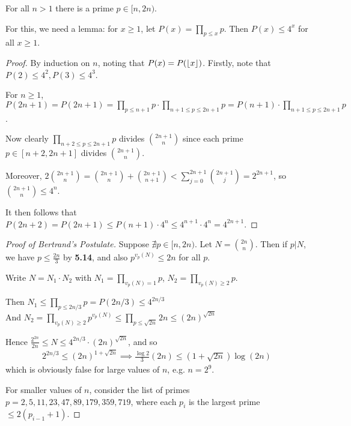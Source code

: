 \documentclass[10pt,a4paper]{article}
\begin{document}
\begin{theorem}
For all $n > 1$ there is a prime $p \in [n, 2n)$.
\end{theorem}
For this, we need a lemma: for $x \geq 1$, let $P(x) = \prod_{p\leq x} p$. Then $P(x) \leq 4^x$ for all $x \geq 1$.
\begin{proof}
By induction on $n$, noting that $P(x) = P(\lfloor x \rfloor)$. Firstly, note that $P(2) \leq 4^2, P(3) \leq 4^3$.

For $n\geq 1$, $P(2n+1) = P(2n+1) = \prod_{p\leq n+1} p \cdot \prod_{n+1\leq p\leq 2n+1} p = P(n+1) \cdot \prod_{n+1 \leq p\leq 2n+1} p$.

Now clearly $\prod_{n+2\leq p\leq 2n+1}p$ divides $\binom{2n+1}{n}$ since each prime $p \in [n+2, 2n+1]$ divides $\binom{2n+1}{n}$. 

Moreover, $2\binom{2n+1}{n} = \binom{2n+1}{n} + \binom{2n+1}{n+1} < \sum_{j=0}^{2n+1} \binom{2n+1}{j} = 2^{2n+1}$, so $\binom{2n+1}{n}\leq 4^n$.

It then follows that $P(2n+2)=P(2n+1)\leq P(n+1)\cdot 4^n \leq 4^{n+1}\cdot 4^n = 4^{2n+1}$.
\end{proof}
\begin{proof}[Proof of Bertrand's Postulate]
Suppose $\nexists p \in [n,2n)$. Let $N = \binom{2n}{n}$. Then if $p|N$, we have $p \leq \frac{2n}{3}$ by \textbf{5.14}, and also $p^{v_p(N)} \leq 2n$ for all $p$.

Write $N = N_1 \cdot N_2$ with $N_1 = \prod_{v_p(N) = 1} p$, $N_2 = \prod_{v_p(N) \geq 2} p$.

Then $N_1 \leq \prod_{p\leq 2n/3} p = P(2n/3) \leq 4^{2n/3}$\\
And $N_2 = \prod_{v_p(N)\geq 2} p^{v_p(N)} \leq \prod_{p\leq \sqrt{2n}} 2n \leq (2n)^{\sqrt{2n}}$

Hence $\frac{2^{2n}}{2n} \leq N \leq 4^{2n/3} \cdot(2n)^{\sqrt{2n}}$, and so
\begin{align*}
2^{2n/3} \leq (2n)^{1+\sqrt{2n}} \implies \frac{\log 2}{3} (2n) \leq (1+\sqrt{2n})\log(2n)
\end{align*}
which is obviously false for large values of $n$, e.g. $n = 2^9$.

For smaller values of $n$, consider the list of primes $p=2,5,11,23,47,89,179,359,719$, where each $p_i$ is the largest prime $\leq 2(p_{i-1}+1)$.
\end{proof}
\end{document}
